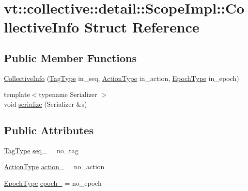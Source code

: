 \hypertarget{structvt_1_1collective_1_1detail_1_1_scope_impl_1_1_collective_info}{}\section{vt\+:\+:collective\+:\+:detail\+:\+:Scope\+Impl\+:\+:Collective\+Info Struct Reference}
\label{structvt_1_1collective_1_1detail_1_1_scope_impl_1_1_collective_info}
\subsection*{Public Member Functions}
\begin{DoxyCompactItemize}
\item 
\hyperlink{structvt_1_1collective_1_1detail_1_1_scope_impl_1_1_collective_info_a6c03d32c5e4fd0239bdb4e62e5971e37}{Collective\+Info} (\hyperlink{namespacevt_a84ab281dae04a52a4b243d6bf62d0e52}{Tag\+Type} in\+\_\+seq, \hyperlink{namespacevt_ae0a5a7b18cc99d7b732cb4d44f46b0f3}{Action\+Type} in\+\_\+action, \hyperlink{namespacevt_a81d11b28122d43bf9834577e4a06440f}{Epoch\+Type} in\+\_\+epoch)
\item 
{\footnotesize template$<$typename Serializer $>$ }\\void \hyperlink{structvt_1_1collective_1_1detail_1_1_scope_impl_1_1_collective_info_ad4e92049edc72a4ff681d34056653588}{serialize} (Serializer \&s)
\end{DoxyCompactItemize}
\subsection*{Public Attributes}
\begin{DoxyCompactItemize}
\item 
\hyperlink{namespacevt_a84ab281dae04a52a4b243d6bf62d0e52}{Tag\+Type} \hyperlink{structvt_1_1collective_1_1detail_1_1_scope_impl_1_1_collective_info_ae8212822c750374cb79a37fe0ef21d7e}{seq\+\_\+} = no\+\_\+tag
\item 
\hyperlink{namespacevt_ae0a5a7b18cc99d7b732cb4d44f46b0f3}{Action\+Type} \hyperlink{structvt_1_1collective_1_1detail_1_1_scope_impl_1_1_collective_info_a60c9ddcd8da8dbab5b66fcef3b6f8ce9}{action\+\_\+} = no\+\_\+action
\item 
\hyperlink{namespacevt_a81d11b28122d43bf9834577e4a06440f}{Epoch\+Type} \hyperlink{structvt_1_1collective_1_1detail_1_1_scope_impl_1_1_collective_info_a36a452ee7268f79249b791b76d81e3ec}{epoch\+\_\+} = no\+\_\+epoch
\end{DoxyCompactItemize}


